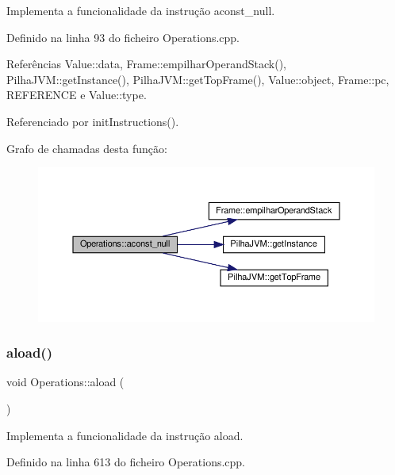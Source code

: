 Implementa a funcionalidade da instrução aconst\+\_\+null. 



Definido na linha 93 do ficheiro Operations.\+cpp.



Referências Value\+::data, Frame\+::empilhar\+Operand\+Stack(), Pilha\+J\+V\+M\+::get\+Instance(), Pilha\+J\+V\+M\+::get\+Top\+Frame(), Value\+::object, Frame\+::pc, R\+E\+F\+E\+R\+E\+N\+CE e Value\+::type.



Referenciado por init\+Instructions().

Grafo de chamadas desta função\+:
\nopagebreak
\begin{figure}[H]
\begin{center}
\leavevmode
\includegraphics[width=350pt]{classOperations_af51ec8a98d9ed3167da0d8ac6279a1cd_cgraph}
\end{center}
\end{figure}
\mbox{\label{classOperations_a2f5c13146658e71de665c3b32ebed8c9}} 
\subsubsection{\texorpdfstring{aload()}{aload()}}
{\footnotesize\ttfamily void Operations\+::aload (\begin{DoxyParamCaption}{ }\end{DoxyParamCaption})\hspace{0.3cm}{\ttfamily [private]}}



Implementa a funcionalidade da instrução aload. 



Definido na linha 613 do ficheiro Operations.\+cpp.



